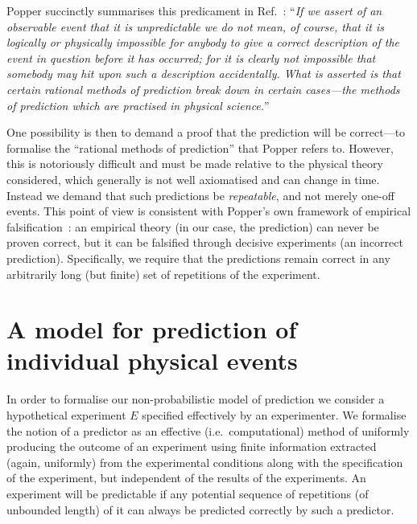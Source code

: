 \documentclass[%
 superscriptaddress,
 preprint,
 showpacs,
 showkeys,
 preprintnumbers,
  amsmath,amssymb,
  aps,
 pra,
  longbibliography,
  floatfix,
 ]{revtex4-1}
\theoremstyle{definition}
\begin{document}
Popper succinctly summarises this predicament in Ref.~\cite[117--118]{popper-50i}:
``\emph{If we assert of an observable event that it is unpredictable we do not mean, of course, that it is logically or physically impossible for anybody to give a correct description of the event in question before it has occurred;
for it is clearly not impossible that somebody may hit upon such a description accidentally.
What is asserted is that certain rational methods of prediction break down in certain cases---the methods of prediction which are practised in physical science.}''

One possibility is then to demand a proof that the prediction will be correct---to formalise the ``rational methods of prediction'' that Popper refers to.
However, this is notoriously difficult and must be made relative to the physical theory considered, which generally is not well axiomatised and can change in time.
Instead we demand that such predictions be {\em repeatable}, and not merely one-off events.
This point of view is consistent with Popper's own framework of empirical falsification~\cite{popper,popper-en}: an empirical theory (in our case, the prediction) can never be proven correct, but it can be falsified through decisive experiments (an incorrect prediction).
Specifically, we require that the predictions remain correct
in any arbitrarily long (but finite) set of repetitions of the experiment.
\section{A model for prediction of individual physical events}


In order to formalise our non-probabilistic model of prediction we consider a hypothetical experiment $E$ specified effectively by an experimenter.
We formalise the notion of a predictor as an effective (i.e.\ computational) method of uniformly %
producing the outcome of an experiment using finite information extracted (again, uniformly) from the experimental conditions along with the specification of the experiment,
 but independent of the results of the experiments.
 An experiment will be predictable if any potential sequence of repetitions (of unbounded length) of it can always be predicted correctly by such a predictor.
\end{document}

